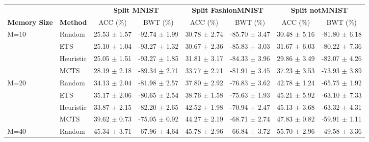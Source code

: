 \begin{tabular}{llcccccc}
 \toprule
                       &                 & \multicolumn{2}{c}{\textbf{Split MNIST}} & \multicolumn{2}{c}{\textbf{Split FashionMNIST}} & \multicolumn{2}{c}{\textbf{Split notMNIST}} \\
\cmidrule(lr){3-4} \cmidrule(lr){5-6}
\textbf{Memory Size}   & \textbf{Method} & ACC (\%)           & BWT (\%)            & ACC (\%)               & BWT (\%)               & ACC (\%)             & BWT (\%)             \\
\midrule
\multirow{4}{*}{M=10}  & Random          & 25.53 $\pm$ 1.57     & -92.74 $\pm$ 1.99     & 30.78 $\pm$ 2.74         & -85.70 $\pm$ 3.47        & 30.48 $\pm$ 5.16       & -81.80 $\pm$ 6.18      \\
                       & ETS             & 25.10 $\pm$ 1.04     & -93.27 $\pm$ 1.32     & 30.67 $\pm$ 2.36         & -85.83 $\pm$ 3.03        & 31.67 $\pm$ 6.03       & -80.22 $\pm$ 7.36      \\
                       & Heuristic         & 25.05 $\pm$ 1.51     & -93.27 $\pm$ 1.85     & 31.81 $\pm$ 3.17         & -84.33 $\pm$ 3.96        & 29.86 $\pm$ 3.49       & -82.07 $\pm$ 4.26      \\
                       & MCTS            & 28.19 $\pm$ 2.18     & -89.34 $\pm$ 2.71     & 33.77 $\pm$ 2.71         & -81.91 $\pm$ 3.45        & 37.23 $\pm$ 3.53       & -73.93 $\pm$ 3.89      \\
\midrule
\multirow{4}{*}{M=20}  & Random          & 34.13 $\pm$ 2.04     & -81.98 $\pm$ 2.57     & 37.80 $\pm$ 2.92         & -76.83 $\pm$ 3.62        & 42.78 $\pm$ 1.24       & -65.75 $\pm$ 1.92      \\
                       & ETS             & 35.17 $\pm$ 2.06     & -80.65 $\pm$ 2.54     & 38.76 $\pm$ 1.58         & -75.63 $\pm$ 1.93        & 45.21 $\pm$ 5.92       & -63.10 $\pm$ 7.33      \\
                       & Heuristic         & 33.87 $\pm$ 2.15     & -82.20 $\pm$ 2.65     & 42.52 $\pm$ 1.98         & -70.94 $\pm$ 2.47        & 45.13 $\pm$ 3.68       & -63.32 $\pm$ 4.31      \\
                       & MCTS            & 39.62 $\pm$ 0.73     & -75.05 $\pm$ 0.92     & 44.27 $\pm$ 2.19         & -68.71 $\pm$ 2.74        & 47.83 $\pm$ 0.82       & -59.91 $\pm$ 1.11      \\
\midrule
\multirow{4}{*}{M=40}  & Random          & 45.34 $\pm$ 3.71     & -67.96 $\pm$ 4.64     & 45.78 $\pm$ 2.96         & -66.84 $\pm$ 3.72        & 55.70 $\pm$ 2.96       & -49.58 $\pm$ 3.36      \\

\end{tabular}

